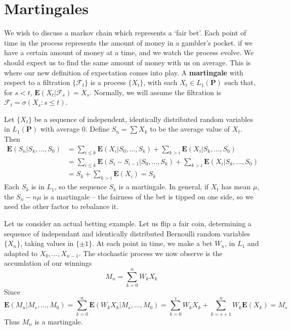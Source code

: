 \section{Martingales}

We wish to discuss a markov chain which represents a `fair bet'. Each point of time in the process represents the amount of   money in a gambler's pocket. if we have a certain amount of money at a time, and we watch the process evolve. We should expect us to find the same amount of money with us on average. This is where our new definition of expectation comes into play. A {\bf martingale} with respect to a filtration $\{ \mathcal{F}_t \}$ is a process $\{X_t\}$, with each $X_t \in L_1(\mathbf{P})$ such that, for $s < t$, $\mathbf{E}(X_t | \mathcal{F}_s) = X_s$. Normally, we will assume the filtration is $\mathcal{F}_t = \sigma(X_s : s \leq t)$.

\begin{example}
    Let $\{ X_t \}$ be a sequence of independent, identically distributed random variables in $L_1(\mathbf{P})$ with average 0. Define $S_n = \sum X_k$ to be the average value of $X_t$. Then
    \begin{align*}
        \mathbf{E}(S_n | S_k, \dots, S_0) &= \sum_{i \leq k} \mathbf{E}(X_i | S_0, \dots, S_k) + \sum_{k > i} \mathbf{E}(X_i | S_k, \dots, S_0)\\
        &= \sum_{i \leq k} \mathbf{E}(S_{i} - S_{i-1} | S_0, \dots, S_k) + \sum_{k > i} \mathbf{E}(X_i | S_k, \dots, S_0)\\
        &= S_k + \sum_{k > i} \mathbf{E}(X_i) = S_k
    \end{align*}
    Each $S_k$ is in $L_1$, so the sequence $S_k$ is a martingale. In general, if $X_t$ has mean $\mu$, the $S_n - n \mu$ is a martingale -- the fairness of the bet is tipped on one side, so we need the other factor to rebalance it.
\end{example}

\begin{example}
    Let us consider an actual betting example. Let us flip a fair coin, determining a sequence of independant and identically distributed Bernoulli random variables $\{ X_n \}$, taking values in $\{ \pm 1 \}$. At each point in time, we make a bet $W_n$, in $L_1$ and adapted to $X_0, \dots, X_{n-1}$. The stochastic process we now observe is the accumlation of our winnings
    \[ M_n = \sum_{k = 0}^n W_k X_k \]
    Since
    \[ \mathbf{E}(M_n | M_s, \dots, M_0) = \sum_{k = 0}^n \mathbf{E}(W_k X_k | M_s, \dots, M_0) = \sum_{k = 0}^s W_k X_k + \sum_{k = s+1}^n W_k \mathbf{E}(X_k) = M_s \]
    Thus $M_n$ is a martingale.
\end{example}

